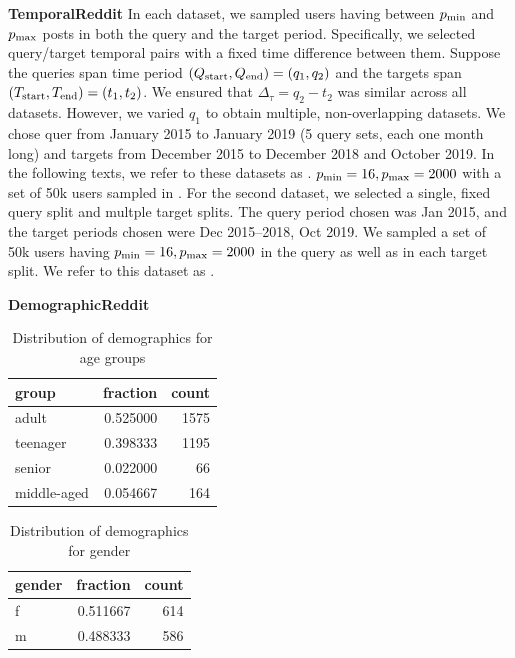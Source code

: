 \noindent \textbf{TemporalReddit} 
In each dataset, we sampled users having between $p_{\rm{min}}$ and $p_{\rm{max}}$ posts in both the query and the target period. 
Specifically, we selected query/target temporal pairs with a fixed time difference between them.
Suppose the queries span time period $(Q_{\rm{start}}, Q_{\rm{end}}) = (q_1, q_2)$ and the targets span $(T_{\rm{start}}, T_{\rm{end}}) = (t_1, t_2)$.
We ensured that $\Delta_\tau = q_2 - t_2$ was similar across all datasets. 
However, we varied $q_1$ to obtain multiple, non-overlapping datasets.
We chose quer from January 2015 to January 2019 (5 query sets, each one month long) and targets from December 2015 to December 2018 and October 2019.
In the following texts, we refer to these datasets as \DSfixeddelta{}.
$p_{\rm{min}} = 16, p_{\rm{max}} = 2000$ with a set of 50k users sampled in \DSfixeddelta{}{}.
For the second dataset, we selected a single, fixed query split and multple target splits. 
The query period chosen was Jan 2015, and the target periods chosen were Dec 2015--2018, Oct 2019. 
We sampled a set of 50k users having $p_{\rm{min}} = 16, p_{\rm{max}} = 2000$ in the query as well as in each target split.
We refer to this dataset as \DSvarydelta{}. 

\textbf{DemographicReddit}

\begin{table}[h]
    \centering
    \begin{tabular}{lrr}
    \toprule
    group & fraction & count \\
    \midrule
    adult & 0.525000 & 1575 \\
    teenager & 0.398333 & 1195 \\
    senior & 0.022000 & 66 \\
    middle-aged & 0.054667 & 164 \\
    \bottomrule
    \end{tabular}
    \caption{Distribution of demographics for age groups}
    \label{tab:demographics:age_dist}
\end{table}

\begin{table}[]
    \centering
    \begin{tabular}{lrr}
    \toprule
    gender & fraction & count \\
    \midrule
    f & 0.511667 & 614 \\
    m & 0.488333 & 586 \\
    \bottomrule
    \end{tabular}
    \caption{Distribution of demographics for gender}
    \label{tab:demographics:gender_dist}
\end{table}


